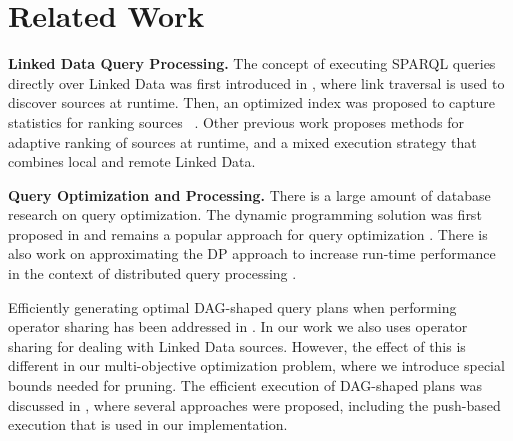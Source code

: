 \section{Related Work}
\label{sec:related}

\textbf{Linked Data Query Processing.} The concept of executing SPARQL
queries directly over Linked Data was first introduced in \cite{hartig_executing_2009},
where link traversal is used to discover sources at runtime. Then, an optimized index was proposed to capture statistics for ranking sources~
\cite{harth_data_2010}. Other previous work
\cite{ladwig_linked_2010,sihjoin_2011} proposes methods for adaptive ranking
of sources at runtime, and a mixed execution
strategy that combines local and remote Linked Data. %






\textbf{Query Optimization and Processing.} There is a large amount of
database research on query optimization. The dynamic programming
solution was first proposed in \cite{selinger_access_1979} and remains a
popular approach for query optimization
\cite{moerkotte_dynamic_2008}. There is also work on approximating the DP approach to increase run-time
performance in the context of distributed query processing
\cite{kossmann_iterative_2000}.

Efficiently generating optimal DAG-shaped query plans when performing
operator sharing has been addressed in
\cite{neumann_generating_2009}. In our work we also uses operator
sharing for dealing with Linked Data sources. However, the effect of this is different in our multi-objective optimization problem, where we introduce special bounds needed for pruning. 
The efficient
execution of DAG-shaped plans was discussed in \cite{Neumann_2005},
where several approaches were proposed, including the push-based
execution that is used in our implementation. 

